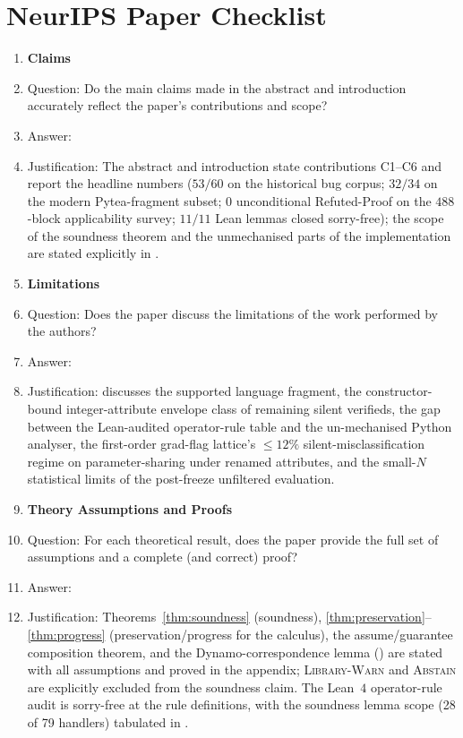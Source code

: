 \newpage
\section*{NeurIPS Paper Checklist}

\begin{enumerate}

\item {\bf Claims}
    \item[] Question: Do the main claims made in the abstract and introduction accurately reflect the paper's contributions and scope?
    \item[] Answer: \answerYes{}
    \item[] Justification: The abstract and introduction state contributions C1--C6 and report the headline numbers ($53/60$ on the historical bug corpus; $32/34$ on the modern Pytea-fragment subset; $0$ unconditional Refuted-Proof on the $488$-block applicability survey; $11/11$ Lean lemmas closed sorry-free); the scope of the soundness theorem and the unmechanised parts of the implementation are stated explicitly in .

\item {\bf Limitations}
    \item[] Question: Does the paper discuss the limitations of the work performed by the authors?
    \item[] Answer: \answerYes{}
    \item[] Justification:  discusses the supported language fragment, the constructor-bound integer-attribute envelope class of remaining silent verifieds, the gap between the Lean-audited operator-rule table and the un-mechanised Python analyser, the first-order grad-flag lattice's $\le 12\%$ silent-misclassification regime on parameter-sharing under renamed attributes, and the small-$N$ statistical limits of the post-freeze unfiltered evaluation.

\item {\bf Theory Assumptions and Proofs}
    \item[] Question: For each theoretical result, does the paper provide the full set of assumptions and a complete (and correct) proof?
    \item[] Answer: \answerYes{}
    \item[] Justification: Theorems~\ref{thm:soundness} (soundness), \ref{thm:preservation}--\ref{thm:progress} (preservation/progress for the calculus), the assume/guarantee composition theorem, and the Dynamo-correspondence lemma () are stated with all assumptions and proved in the appendix; \textsc{Library-Warn} and \textsc{Abstain} are explicitly excluded from the soundness claim. The Lean~$4$ operator-rule audit is sorry-free at the rule definitions, with the soundness lemma scope (28 of 79 handlers) tabulated in .


\end{enumerate}
